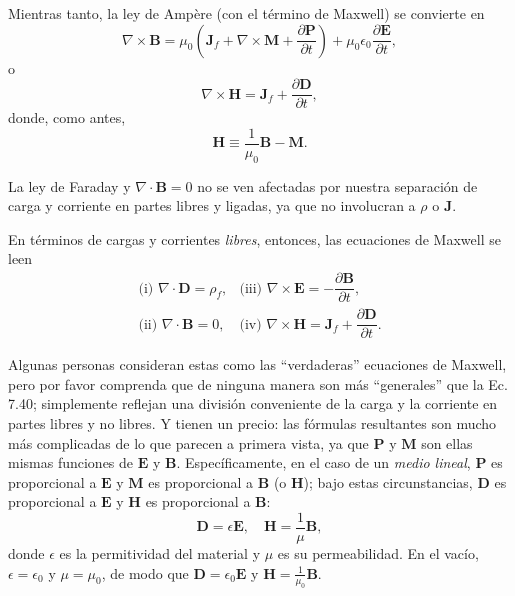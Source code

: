 \documentclass[12pt,a4paper]{report}
\begin{document}
	Mientras tanto, la ley de Ampère (con el término de Maxwell) se convierte en
	\begin{equation*}
		\nabla \times \mathbf{B} = \mu_0 \left( \mathbf{J}_f + \nabla \times \mathbf{M} + \frac{\partial \mathbf{P}}{\partial t} \right) + \mu_0 \epsilon_0 \frac{\partial \mathbf{E}}{\partial t},
	\end{equation*}
	o
	\begin{equation}
		\nabla \times \mathbf{H} = \mathbf{J}_f + \frac{\partial \mathbf{D}}{\partial t}, \tag{7.54}
	\end{equation}
	donde, como antes,
	\begin{equation}
		\mathbf{H} \equiv \frac{1}{\mu_0} \mathbf{B} - \mathbf{M}. \tag{7.55}
	\end{equation}
	
	La ley de Faraday y $\nabla \cdot \mathbf{B} = 0$ no se ven afectadas por nuestra separación de carga y corriente en partes libres y ligadas, ya que no involucran a $\rho$ o $\mathbf{J}$.
	
	En términos de cargas y corrientes \textit{libres}, entonces, las ecuaciones de Maxwell se leen
	\begin{equation}
		\begin{array}{ll}
			\text{(i) } \nabla \cdot \mathbf{D} = \rho_f, & \text{(iii) } \nabla \times \mathbf{E} = -\dfrac{\partial \mathbf{B}}{\partial t}, \\
			\text{(ii) } \nabla \cdot \mathbf{B} = 0, & \text{(iv) } \nabla \times \mathbf{H} = \mathbf{J}_f + \dfrac{\partial \mathbf{D}}{\partial t}.
		\end{array} \tag{7.56}
	\end{equation}
	
	Algunas personas consideran estas como las ``verdaderas'' ecuaciones de Maxwell, pero por favor comprenda que de ninguna manera son más ``generales'' que la Ec. 7.40; simplemente reflejan una división conveniente de la carga y la corriente en partes libres y no libres. Y tienen un precio: las fórmulas resultantes son mucho más complicadas de lo que parecen a primera vista, ya que $\mathbf{P}$ y $\mathbf{M}$ son ellas mismas funciones de $\mathbf{E}$ y $\mathbf{B}$. Específicamente, en el caso de un \textit{medio lineal}, $\mathbf{P}$ es proporcional a $\mathbf{E}$ y $\mathbf{M}$ es proporcional a $\mathbf{B}$ (o $\mathbf{H}$); bajo estas circunstancias, $\mathbf{D}$ es proporcional a $\mathbf{E}$ y $\mathbf{H}$ es proporcional a $\mathbf{B}$:
	\begin{equation}
		\mathbf{D} = \epsilon \mathbf{E}, \quad \mathbf{H} = \frac{1}{\mu} \mathbf{B}, \tag{7.57}
	\end{equation}
	donde $\epsilon$ es la permitividad del material y $\mu$ es su permeabilidad. En el vacío, $\epsilon = \epsilon_0$ y $\mu = \mu_0$, de modo que $\mathbf{D} = \epsilon_0 \mathbf{E}$ y $\mathbf{H} = \frac{1}{\mu_0} \mathbf{B}$.
	
\end{document}
